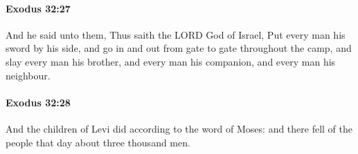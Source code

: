 		\paragraph{Exodus 32:27} %
			\label{EXODUS-32-27}

			And he said unto them, Thus saith the LORD God of Israel, Put every man his sword by his side, and go in and out from gate to gate throughout the camp, and slay every man his brother, and every man his companion, and every man his neighbour.


		\paragraph{Exodus 32:28} %
			\label{EXODUS-32-28}

			And the children of Levi did according to the word of Moses: and there fell of the people that day about three thousand men.


